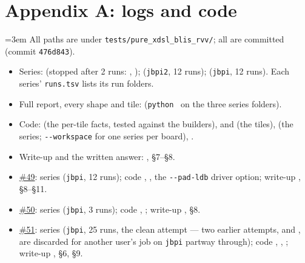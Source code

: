 \documentclass[10pt,a4paper]{article}
\newcommand{\iss}[1]{\href{https://github.com/JieGH/RVV_code_gen_via_MLIR_xDSL/issues/#1}{\##1}}
\begin{document}
\section*{Appendix A: logs and code}
\raggedright\emergencystretch=3em
All paths are under \texttt{tests/pure\_xdsl\_blis\_rvv/}; all are committed (commit \texttt{476d843}).
\begin{itemize}
  \item Series:  (stopped after 2 runs: ,
  );  (\texttt{jbpi2}, 12 runs);
   (\texttt{jbpi}, 12 runs). Each series' \texttt{runs.tsv} lists its run folders.
  \item Full report, every shape and tile: 
  (\texttt{python}~ on the three series folders).
  \item Code:  (the per-tile facts, tested against the builders),
   and  (the tiles),
   (the series; \texttt{-{}-workspace} for one series per board), .
  \item Write-up and the written answer: , \S7--\S8.
  \item \iss{49}: series  (\texttt{jbpi}, 12 runs); code ,
  , the \texttt{-{}-pad-ldb} driver option; write-up
  , \S8--\S11.
  \item \iss{50}: series  (\texttt{jbpi}, 3 runs); code ,
  ; write-up , \S8.
  \item \iss{51}: series  (\texttt{jbpi}, 25 runs, the clean attempt --- two earlier
  attempts,  and , are discarded for another
  user's job on \texttt{jbpi} partway through); code , ,
  ; write-up , \S6, \S9.
\end{itemize}
\end{document}
